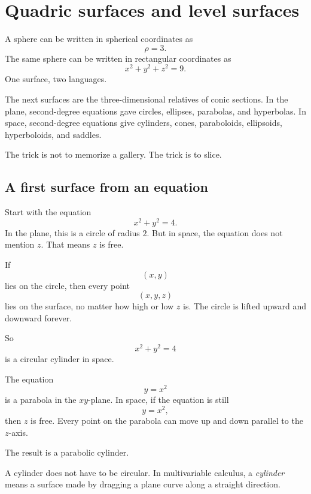 \section{Quadric surfaces and level surfaces}
\label{sec:4.4}

A sphere can be written in spherical coordinates as
\[
    \rho=3.
\]
The same sphere can be written in rectangular coordinates as
\[
    x^2+y^2+z^2=9.
\]
One surface, two languages.

The next surfaces are the three-dimensional relatives of conic sections.  In the plane,
second-degree equations gave circles, ellipses, parabolas, and hyperbolas.  In space,
second-degree equations give cylinders, cones, paraboloids, ellipsoids, hyperboloids,
and saddles.

The trick is not to memorize a gallery.  The trick is to slice.

\subsection{A first surface from an equation}

Start with the equation
\[
    x^2+y^2=4.
\]
In the plane, this is a circle of radius \(2\).  But in space, the equation does not mention
\(z\).  That means \(z\) is free.

If
\[
    (x,y)
\]
lies on the circle, then every point
\[
    (x,y,z)
\]
lies on the surface, no matter how high or low \(z\) is.  The circle is lifted upward and
downward forever.

So
\[
    x^2+y^2=4
\]
is a circular cylinder in space.

\begin{example}
The equation
\[
    y=x^2
\]
is a parabola in the \(xy\)-plane.  In space, if the equation is still
\[
    y=x^2,
\]
then \(z\) is free.  Every point on the parabola can move up and down parallel to the
\(z\)-axis.

The result is a parabolic cylinder.
\end{example}

A cylinder does not have to be circular.  In multivariable calculus, a \emph{cylinder}
means a surface made by dragging a plane curve along a straight direction.

